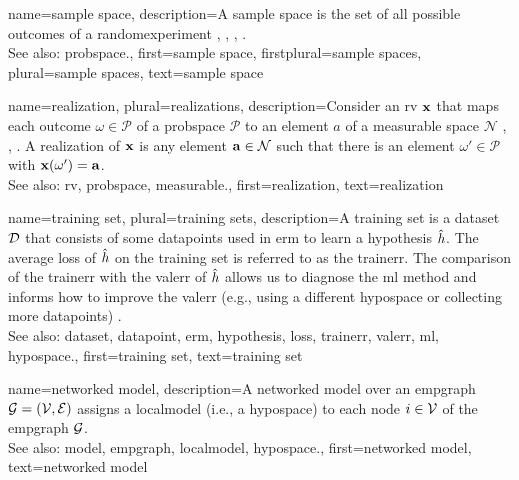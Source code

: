  
  {name={sample space}, 
  	description={A \gls{sample} space is the set of all possible 
		outcomes of a \gls{randomexperiment} \cite{BillingsleyProbMeasure}, 
		\cite{BertsekasProb}, \cite{papoulis}, \cite{AshProbMeasure}. 
		\\
 		See also: \gls{probspace}.},  
  	first={sample space}, 
 	firstplural={sample spaces},
 	plural={sample spaces},
  	text={sample space}
  }
 
	
{name={realization}, plural={realizations},
	description={Consider an \gls{rv} ${\bf x}$ that maps each outcome 
		$\omega \in \mathcal{P}$ of a \gls{probspace} $\mathcal{P}$ to an element $a$ of a \gls{measurable} space 
		$\mathcal{N}$ \cite{RudinBookPrinciplesMatheAnalysis}, \cite{BillingsleyProbMeasure}, \cite{HalmosMeasure}. 
		A realization of ${\bf x}$ is any element ${\bf a} \in \mathcal{N}$ such that there is 
		an element $\omega' \in \mathcal{P}$ with ${\bf x}(\omega') = {\bf a}$.
			\\
		See also: \gls{rv}, \gls{probspace}, \gls{measurable}.}, 
	first={realization},
	text={realization}  
}

{name={training set}, plural={training sets},
	description={A training set is a \gls{dataset} $\mathcal{D}$ that consists of some \glspl{datapoint} used in \gls{erm} 
		to learn a \gls{hypothesis} $\hat{h}$. The average \gls{loss} of $\hat{h}$ on the 
		training set is referred to as the \gls{trainerr}. The comparison of the \gls{trainerr} with the 
		\gls{valerr} of $\hat{h}$ allows us to diagnose the \gls{ml} method and informs how to improve 
		the \gls{valerr} (e.g., using a different \gls{hypospace} or collecting more \glspl{datapoint}) \cite[Sec. 6.6]{MLBasics}.
			\\
		See also: \gls{dataset}, \gls{datapoint}, \gls{erm}, \gls{hypothesis}, \gls{loss}, \gls{trainerr}, \gls{valerr}, \gls{ml}, \gls{hypospace}.},
	first={training set},
	text={training set}  
}

{name={networked model},
 	description={A networked \gls{model} over an \gls{empgraph} $\mathcal{G} = \left( \mathcal{V},\mathcal{E} \right)$ assigns 
   		a \gls{localmodel} (i.e., a \gls{hypospace}) to each node $i \in \mathcal{V}$ of the \gls{empgraph} $\mathcal{G}$.
   		\\
		See also: \gls{model}, \gls{empgraph}, \gls{localmodel}, \gls{hypospace}.}, 
   first={networked model},
   text={networked model}  
}

